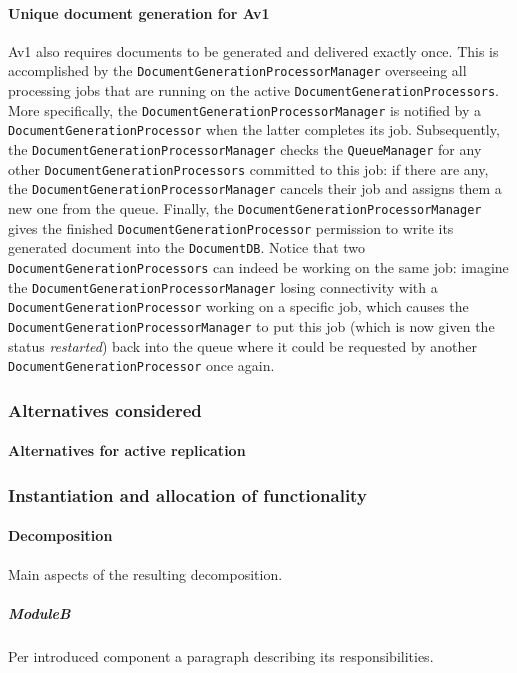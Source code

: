 \documentclass[a4paper,10pt]{article}
\begin{document}
\paragraph{Unique document generation for Av1}
Av1 also requires documents to be generated and delivered exactly once. This is accomplished by the \texttt{DocumentGenerationProcessorManager} overseeing all processing jobs that are running on the active \texttt{DocumentGenerationProcessors}. More specifically, the \texttt{DocumentGenerationProcessorManager} is notified by a \texttt{DocumentGenerationProcessor} when the latter completes its job. Subsequently, the \texttt{DocumentGenerationProcessorManager} checks the \texttt{QueueManager} for any other \texttt{DocumentGenerationProcessors} committed to this job: if there are any, the \texttt{DocumentGenerationProcessorManager} cancels their job and assigns them a new one from the queue. Finally, the \texttt{DocumentGenerationProcessorManager} gives the finished \texttt{DocumentGenerationProcessor} permission to write its generated document into the \texttt{DocumentDB}. Notice that two \texttt{DocumentGenerationProcessors} can indeed be working on the same job: imagine the \texttt{DocumentGenerationProcessorManager} losing connectivity with a \texttt{DocumentGenerationProcessor} working on a specific job, which causes the \texttt{DocumentGenerationProcessorManager} to put this job (which is now given the status \textit{restarted}) back into the queue where it could be requested by another \texttt{DocumentGenerationProcessor} once again.

\subsubsection*{Alternatives considered}
\paragraph{Alternatives for active replication}


\subsubsection{Instantiation and allocation of functionality}
\paragraph{Decomposition}
Main aspects of the resulting decomposition.

\subparagraph{ModuleB}
Per introduced component a paragraph describing its responsibilities.
\end{document}
